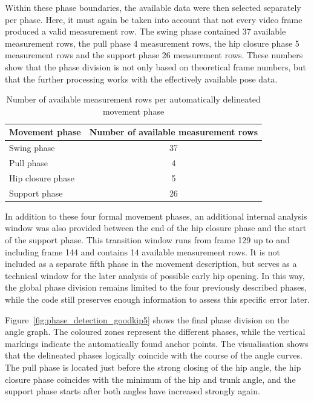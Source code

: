 Within these phase boundaries, the available data were then selected separately per phase. Here, it must again be taken into account that not every video frame produced a valid measurement row. The swing phase contained 37 available measurement rows, the pull phase 4 measurement rows, the hip closure phase 5 measurement rows and the support phase 26 measurement rows. These numbers show that the phase division is not only based on theoretical frame numbers, but that the further processing works with the effectively available pose data.

\begin{table}[H]
    \centering
    \begin{tabular}{lc}
        \toprule
        \textbf{Movement phase} & \textbf{Number of available measurement rows} \\
        \midrule
        Swing phase & 37 \\
        Pull phase & 4 \\
        Hip closure phase & 5 \\
        Support phase & 26 \\
        \bottomrule
    \end{tabular}
    \caption{Number of available measurement rows per automatically delineated movement phase}
    \label{tab:movement_phase_rows}
\end{table}

In addition to these four formal movement phases, an additional internal analysis window was also provided between the end of the hip closure phase and the start of the support phase. This transition window runs from frame 129 up to and including frame 144 and contains 14 available measurement rows. It is not included as a separate fifth phase in the movement description, but serves as a technical window for the later analysis of possible early hip opening. In this way, the global phase division remains limited to the four previously described phases, while the code still preserves enough information to assess this specific error later.

Figure~\ref{fig:phase_detection_goodkip5} shows the final phase division on the angle graph. The coloured zones represent the different phases, while the vertical markings indicate the automatically found anchor points. The visualisation shows that the delineated phases logically coincide with the course of the angle curves. The pull phase is located just before the strong closing of the hip angle, the hip closure phase coincides with the minimum of the hip and trunk angle, and the support phase starts after both angles have increased strongly again.

